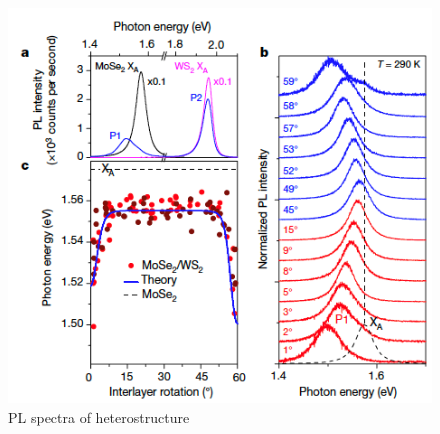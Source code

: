 \begin{figure}[h]
	\begin{center}
		\includegraphics[scale=1]{Heterostructures/HeterostructurePLSpectrumInterlayerTwist.png}
		\caption{PL spectra of heterostructure \cite{Alexeev2019}}
		\label{fig:HeterostructurePLSpectrumInterlayerTwist}
	\end{center}
\end{figure}